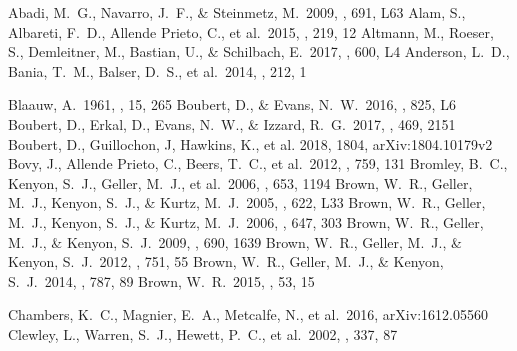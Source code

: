 \documentclass[iop, aj]{emulateapj}
\begin{document}
\begin{thebibliography}{}

 Abadi, M.~G., Navarro, J.~F., \& Steinmetz, M.\ 2009, \apjl, 691, L63
 Alam, S., Albareti, F.~D., Allende Prieto, C., et al.\ 2015, \apjs, 219, 12
 Altmann, M., Roeser, S., Demleitner, M., Bastian, U., \& Schilbach, E.\ 2017, \aap, 600, L4
 Anderson, L.~D., Bania, T.~M., Balser, D.~S., et al.\ 2014, \apjs, 212, 1

 Blaauw, A.\ 1961, \bain, 15, 265
 Boubert, D., \& Evans, N.~W.\ 2016, \apjl, 825, L6
 Boubert, D., Erkal, D., Evans, N.~W., \& Izzard, R.~G.\ 2017, \mnras, 469, 2151
 Boubert, D., Guillochon, J, Hawkins, K., et al. 2018, 1804, arXiv:1804.10179v2
 Bovy, J., Allende Prieto, C., Beers, T.~C., et al.\ 2012, \apj, 759, 131
 Bromley, B.~C., Kenyon, S.~J., Geller, M.~J., et al.\ 2006, \apj, 653, 1194
 Brown, W.~R., Geller, M.~J., Kenyon, S.~J., \& Kurtz, M.~J.\ 2005, \apjl, 622, L33
 Brown, W.~R., Geller, M.~J., Kenyon, S.~J., \& Kurtz, M.~J.\ 2006, \apj, 647, 303
 Brown, W.~R., Geller, M.~J., \& Kenyon, S.~J.\ 2009, \apj, 690, 1639
 Brown, W.~R., Geller, M.~J., \& Kenyon, S.~J.\ 2012, \apj, 751, 55
 Brown, W.~R., Geller, M.~J., \& Kenyon, S.~J.\ 2014, \apj, 787, 89
 Brown, W.~R.\ 2015, \araa, 53, 15

 Chambers, K.~C., Magnier, E.~A., Metcalfe, N., et al.\ 2016, arXiv:1612.05560
 Clewley, L., Warren, S.~J., Hewett, P.~C., et al.\ 2002, \mnras, 337, 87



\end{thebibliography}
\end{document}
